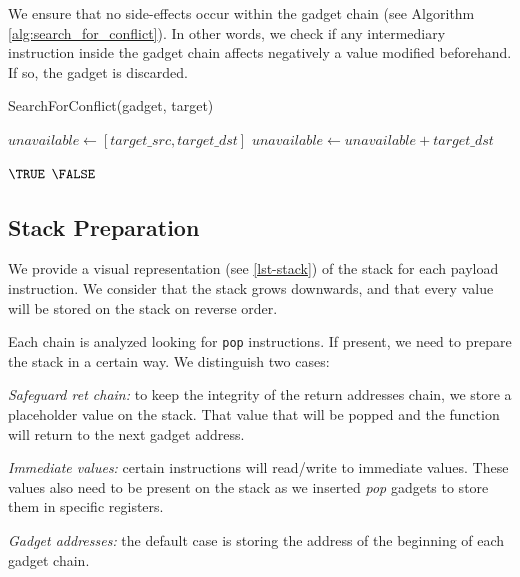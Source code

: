 \documentclass[10pt,twocolumn]{article}
\begin{document}
We ensure that no side-effects occur within the gadget chain (see Algorithm 
\autoref{alg:search_for_conflict}). In other words,
we check if any intermediary instruction inside the gadget chain affects
negatively a value modified beforehand. If so, the gadget is discarded.

\begin{algorithm}
    \caption{SearchForConflict(gadget, target)}
    \label{alg:search_for_conflict}
    \begin{algorithmic}[1]
        \STATE $unavailable \leftarrow [target\_src, target\_dst]$
            \STATE $unavailable \leftarrow unavailable + target\_dst$
        \ENDIF
        
            \RETURN $\TRUE$
            \ENDIF
        \ENDFOR
        \RETURN $\FALSE$
    \end{algorithmic}
\end{algorithm}

\subsection{Stack Preparation}

We provide a visual representation (see \autoref{lst-stack}) of the stack for
each payload instruction.  We consider that the stack grows downwards, and that
every value will be stored on the stack on reverse order.

Each chain is analyzed looking for \texttt{pop} instructions. If present, we
need to prepare the stack in a certain way. We distinguish
two cases:

\textit{Safeguard ret chain:} to keep the integrity of the return addresses
chain, we store a placeholder value on the stack. That value that will be
popped and the function will return to the next gadget address.

\textit{Immediate values:} certain instructions will read/write to immediate
values. These values also need to be present on the stack as we inserted
\textit{pop} gadgets to store them in specific registers.

\textit{Gadget addresses:} the default case is storing the address of the
beginning of each gadget chain.
\end{document}
